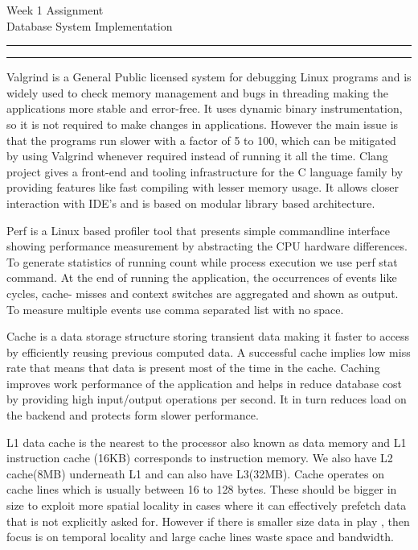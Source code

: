 \documentclass{article}
\newcommand{\soptitle}{Week 1 Assignment}
\begin{document}
\begin{center}\LARGE\soptitle\\
\large Database System Implementation
\end{center}

\hrule
\vspace{1pt}
\hrule height 1pt

\bigskip
Valgrind\cite{valgrind} is a General Public licensed system for debugging Linux programs and is widely used to check memory management and bugs in threading making the applications more stable and error-free. It uses dynamic binary instrumentation, so it is not required to make changes in applications. However the main issue is that the programs run slower with a factor of 5 to 100, which can be mitigated by using Valgrind whenever required instead of running it all the time. Clang\cite{perf} project gives a front-end and tooling infrastructure for the C language family by providing features like fast compiling with lesser memory usage. It allows closer interaction with IDE's and is based on modular library based architecture. 
\bigskip


\bigskip
Perf \cite{perf} is a Linux based profiler tool that presents simple commandline interface showing performance measurement by abstracting the CPU hardware differences. To generate statistics of running count while process execution we use perf stat command. At the end of running the application, the occurrences of events like cycles, cache- misses and context switches are aggregated and shown as output. To measure multiple events use comma separated list with no space.

\bigskip
Cache \cite{caching}is a data storage structure storing transient data making it faster to access by efficiently reusing previous computed data. A successful cache implies low miss rate that means that data is present most of the time in the cache. Caching improves work performance of the application and helps in reduce database cost by providing high input/output operations per second. It in turn reduces load on the backend and protects form slower performance.

\bigskip
\bigskip
L1 data cache is the nearest to the processor also known as data memory and L1 instruction cache (16KB) corresponds to instruction memory. We also have L2 cache(8MB) underneath L1 and can also have L3(32MB). Cache operates on cache lines which is usually between 16 to 128 bytes. These should be bigger in size to exploit more spatial locality in cases where it can effectively prefetch data that is not explicitly asked for. However if there is smaller size data in play , then focus is on temporal locality and large cache lines waste space and bandwidth\cite{cache}.
\bigskip
\end{document}

